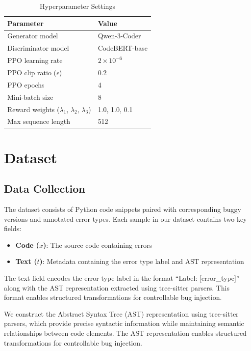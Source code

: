\begin{table}[h]
\centering
\caption{Hyperparameter Settings}
\label{tab:hyperparameters}
\begin{tabular}{p{4cm} p{3cm}}
\toprule
\textbf{Parameter} & \textbf{Value} \\
\midrule
Generator model & Qwen-3-Coder \\
Discriminator model & CodeBERT-base \\
PPO learning rate & $2 \times 10^{-6}$ \\
PPO clip ratio ($\epsilon$) & 0.2 \\
PPO epochs & 4 \\
Mini-batch size & 8 \\
Reward weights ($\lambda_1$, $\lambda_2$, $\lambda_3$) & 1.0, 1.0, 0.1 \\
Max sequence length & 512 \\
\bottomrule
\end{tabular}
\end{table}

\section{Dataset}

\subsection{Data Collection}

The dataset consists of Python code snippets paired with corresponding buggy versions and annotated error types. Each sample in our dataset contains two key fields:

\begin{itemize}
    \item \textbf{Code ($x$)}: The source code containing errors
    \item \textbf{Text ($t$)}: Metadata containing the error type label and AST representation
\end{itemize}

The text field encodes the error type label in the format ``Label: [error\_type]'' along with the AST representation extracted using tree-sitter parsers. This format enables structured transformations for controllable bug injection.

We construct the Abstract Syntax Tree (AST) representation using tree-sitter parsers, which provide precise syntactic information while maintaining semantic relationships between code elements. The AST representation enables structured transformations for controllable bug injection.


